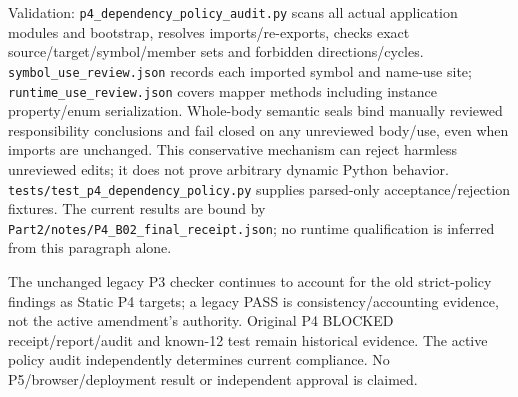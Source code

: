 Validation: \texttt{p4\_\allowbreak{}dependency\_\allowbreak{}policy\_\allowbreak{}audit.\allowbreak{}py} scans all actual application modules and bootstrap, resolves imports/re-exports, checks exact source/target/symbol/member sets and forbidden directions/cycles. \texttt{symbol\_\allowbreak{}use\_\allowbreak{}review.\allowbreak{}json} records each imported symbol and name-use site; \texttt{runtime\_\allowbreak{}use\_\allowbreak{}review.\allowbreak{}json} covers mapper methods including instance property/enum serialization. Whole-body semantic seals bind manually reviewed responsibility conclusions and fail closed on any unreviewed body/use, even when imports are unchanged. This conservative mechanism can reject harmless unreviewed edits; it does not prove arbitrary dynamic Python behavior. \texttt{tests/\allowbreak{}test\_\allowbreak{}p4\_\allowbreak{}dependency\_\allowbreak{}policy.\allowbreak{}py} supplies parsed-only acceptance/rejection fixtures. The current results are bound by \texttt{Part2/\allowbreak{}notes/\allowbreak{}P4\_\allowbreak{}B02\_\allowbreak{}final\_\allowbreak{}receipt.\allowbreak{}json}; no runtime qualification is inferred from this paragraph alone.

The unchanged legacy P3 checker continues to account for the old strict-policy findings as Static P4 targets; a legacy PASS is consistency/accounting evidence, not the active amendment's authority. Original P4 BLOCKED receipt/report/audit and known-12 test remain historical evidence. The active policy audit independently determines current compliance. No P5/browser/deployment result or independent approval is claimed.
